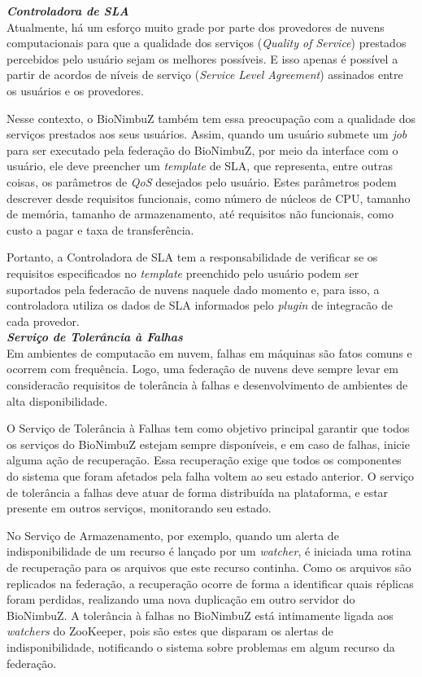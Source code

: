 \noindent
\textbf{\textit{Controladora de SLA}} \\

\noindent
Atualmente, há um esforço muito grade por parte dos provedores de nuvens computacionais para que a qualidade dos serviços (\textit{Quality of Service}) prestados percebidos pelo usuário sejam os melhores possíveis. E isso apenas é possível a partir de acordos de níveis de serviço (\textit{Service Level Agreement}) assinados entre os usuários e os provedores. 

Nesse contexto, o BioNimbuZ também tem essa preocupação com a qualidade dos serviços prestados aos seus usuários. Assim, quando um usuário submete um \textit{job} para ser executado pela federação do BioNimbuZ, por meio da interface com o usuário, ele deve preencher um \textit{template} de SLA, que representa, entre outras coisas, os parâmetros de \textit{QoS} desejados pelo usuário. Estes parâmetros podem descrever desde requisitos funcionais, como número de núcleos de CPU, tamanho de memória, tamanho de armazenamento, até requisitos não funcionais, como custo a pagar e taxa de transferência.

Portanto, a Controladora de SLA tem a responsabilidade de verificar se os requisitos especificados no \textit{template} preenchido pelo usuário podem ser suportados pela federacão de nuvens naquele dado momento e, para isso, a controladora utiliza os dados de SLA informados pelo \textit{plugin} de integracão de cada provedor. \\

\noindent
\textbf{\textit{Serviço de Tolerância à Falhas}} \\

\noindent
Em ambientes de computacão em nuvem, falhas em máquinas são fatos comuns e ocorrem com frequência. Logo, uma federação de nuvens deve sempre levar em consideracão requisitos de tolerância à falhas e desenvolvimento de ambientes de alta disponibilidade.

O Serviço de Tolerância à Falhas tem como objetivo principal garantir que todos os serviços do BioNimbuZ estejam sempre disponíveis, e em caso de falhas, inicie alguma ação de recuperação. Essa recuperação exige que todos os componentes do sistema que foram afetados pela falha voltem ao seu estado anterior. O serviço de tolerância a falhas deve atuar de forma distribuída na plataforma, e estar presente em outros serviços, monitorando seu estado. 

No Serviço de Armazenamento, por exemplo, quando um alerta de indisponibilidade de um recurso é lançado por um \textit{watcher}, é iniciada uma rotina de recuperação para os arquivos que este recurso continha. Como os arquivos são replicados na federação, a recuperação ocorre de forma a identificar quais réplicas foram perdidas, realizando uma nova duplicação em outro servidor do BioNimbuZ. A tolerância à falhas no BioNimbuZ está intimamente ligada aos \textit{watchers} do ZooKeeper, pois são estes que disparam os alertas de indisponibilidade, notificando o sistema sobre problemas em algum recurso da federação.\\

